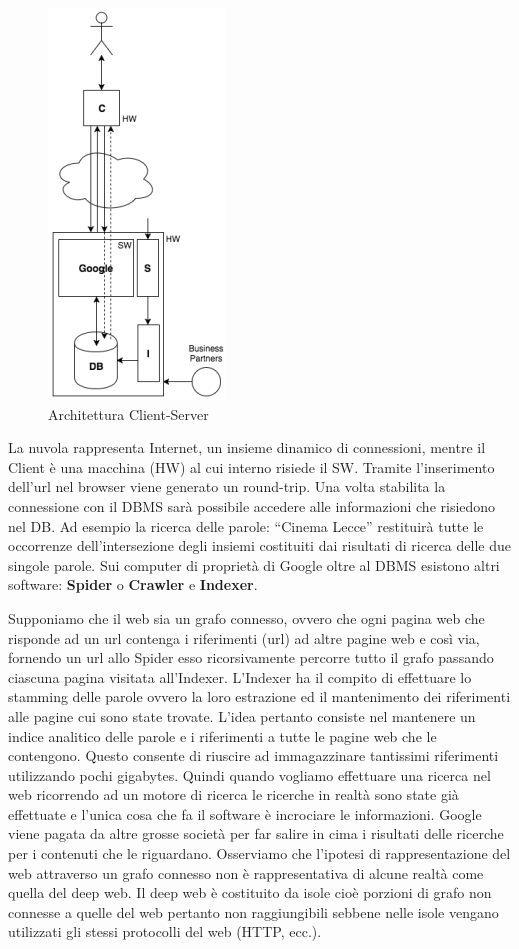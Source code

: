 \begin{center}
\begin{figure}[H]
\centering
\includegraphics[scale=1]{figures/cs.png}
\caption{Architettura Client-Server} 
\end{figure}
\end{center}

La nuvola rappresenta Internet, un insieme dinamico di connessioni, mentre il Client è una macchina (HW) al cui interno risiede il SW. Tramite l’inserimento dell’url nel browser viene generato un round-trip. Una volta stabilita la connessione con il DBMS sarà possibile accedere alle informazioni che risiedono nel DB. Ad esempio la ricerca delle parole: “Cinema Lecce” restituirà tutte le occorrenze dell’intersezione degli insiemi costituiti dai risultati di ricerca delle due singole parole. Sui computer di proprietà di Google oltre al DBMS esistono altri software: \textbf{Spider} o \textbf{Crawler} e \textbf{Indexer}. 

Supponiamo che il web sia un grafo connesso, ovvero che ogni pagina web che risponde ad un url contenga i riferimenti (url) ad altre pagine web e così via, fornendo un url allo Spider esso ricorsivamente percorre tutto il grafo passando ciascuna pagina visitata all’Indexer. L’Indexer ha il compito di effettuare lo stamming delle parole ovvero la loro estrazione ed il mantenimento dei riferimenti alle pagine cui sono state trovate. L’idea pertanto consiste nel mantenere un indice analitico delle parole e i riferimenti a tutte le pagine web che le contengono. Questo consente di riuscire ad immagazzinare tantissimi riferimenti utilizzando pochi gigabytes. Quindi quando vogliamo effettuare una ricerca nel web ricorrendo ad un motore di ricerca le ricerche in realtà sono state già effettuate e l’unica cosa che fa il software è incrociare le informazioni. Google viene pagata da altre grosse società per far salire in cima i risultati delle ricerche per i contenuti che le riguardano. Osserviamo che l’ipotesi di rappresentazione del web attraverso un grafo connesso non è rappresentativa di alcune realtà come quella del deep web. Il deep web è costituito da isole cioè porzioni di grafo non connesse a quelle del web pertanto non raggiungibili sebbene nelle isole vengano utilizzati gli stessi protocolli del web (HTTP, ecc.).   

